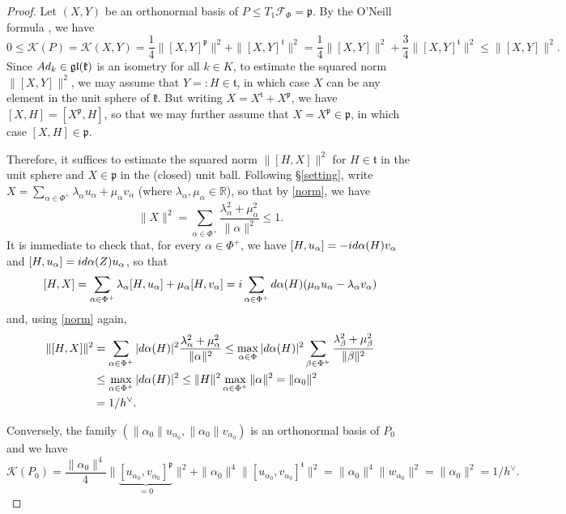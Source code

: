 \documentclass[11pt,twoside]{amsart}
\theoremstyle{plain}
\newcommand{\R}{{\mathbb R}}
\begin{document}
\begin{proof}
Let $(X,Y)$ be an orthonormal basis of $P\le T_1\mathcal{F}_\Phi=\mathfrak{p}$. By the O'Neill formula \cite[Theorems 3.61 \& 3.65]{gallot-hulin-lafontaine}, we have
\[0\le\mathcal{K}(P)=\mathcal{K}(X,Y)=\frac14\|[X,Y]^\mathfrak{p}\|^2+\|[X,Y]^\mathfrak{t}\|^2=\frac14\|[X,Y]\|^2+\frac34\|[X,Y]^\mathfrak{t}\|^2\le\|[X,Y]\|^2.\]
Since ${\rm Ad}_k\in\mathfrak{gl}(\mathfrak{k})$ is an isometry for all $k\in K$, to estimate the squared norm $\|[X,Y]\|^2$, we may assume that $Y=:H\in\mathfrak{t}$, in which case $X$ can be any element in the unit sphere of $\mathfrak{k}$. But writing $X=X^{\mathfrak{t}}+X^{\mathfrak{p}}$, we have $[X,H]=[X^{\mathfrak{p}},H]$, so that we may further assume that $X=X^{\mathfrak{p}}\in\mathfrak{p}$, in which case $[X,H]\in\mathfrak{p}$.

Therefore, it suffices to estimate the squared norm $\|[H,X]\|^2$ for $H\in\mathfrak{t}$ in the unit sphere and $X\in\mathfrak{p}$ in the (closed) unit ball. Following \S \ref{setting}, write $X=\sum_{\alpha\in\Phi^+}\lambda_\alpha u_\alpha+\mu_\alpha v_\alpha$ (where $\lambda_\alpha,\mu_\alpha\in\R$), so that by \eqref{norm}, we have
\[\|X\|^2=\sum_{\alpha\in\Phi^+}\frac{\lambda_\alpha^2+\mu_\alpha^2}{\|\alpha\|^2}\le1.\]
It is immediate to check that, for every $\alpha\in\Phi^+$, we have $[H,u_\alpha]=-i{\rm d}\alpha(H)v_\alpha$ and $[H,u_\alpha]=i{\rm d}\alpha(Z)u_\alpha$, so that
\[[H,X]=\sum_{\alpha\in\Phi^+}\lambda_\alpha[H,u_\alpha]+\mu_\alpha[H,v_\alpha]=i\sum_{\alpha\in\Phi^+}{\rm d}\alpha(H)(\mu_\alpha u_\alpha-\lambda_\alpha v_\alpha)\]
and, using \eqref{norm} again,
\begin{align*}
\|[H,X]\|^2&=\sum_{\alpha\in\Phi^+}|{\rm d}\alpha(H)|^2\frac{\lambda_\alpha^2+\mu_\alpha^2}{\|\alpha\|^2}\le\max_{\alpha\in\Phi}|{\rm d}\alpha(H)|^2\sum_{\beta\in\Phi^+}\frac{\lambda_\beta^2+\mu_\beta^2}{\|\beta\|^2} \\
&\le\max_{\alpha\in\Phi^+}|{\rm d}\alpha(H)|^2\le\|H\|^2\max_{\alpha\in\Phi^+}\|\alpha\|^2=\|\alpha_0\|^2 \\
&={1}/{h^\vee}.
\end{align*}

Conversely, the family $(\|\alpha_0\|u_{\alpha_0},\|\alpha_0\|v_{\alpha_0})$ is an orthonormal basis of $P_0$ and we have
\[\mathcal{K}(P_0)=\frac{\|\alpha_0\|^4}{4}\|\underbrace{[u_{\alpha_0},v_{\alpha_0}]^\mathfrak{p}}_{=0}\|^2+\|\alpha_0\|^4\|[u_{\alpha_0},v_{\alpha_0}]^\mathfrak{t}\|^2=\|\alpha_0\|^4\|w_{\alpha_0}\|^2=\|\alpha_0\|^2=1/h^\vee.\]
\end{proof}
\end{document}
